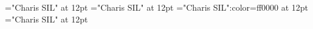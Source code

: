 \documentclass[a4paper]{article}
\begin{document}
\pagestyle{plain}
\sloppy
\setlength{\parfillskip}{0pt plus 1fil}
\font{}="Charis SIL" at 12pt
\font\cletHeaddicBody="Charis SIL" at 12pt
\font\aletHeaddicBody="Charis SIL":color=ff0000 at 12pt
\font\bletHeaddicBody="Charis SIL" at 12pt

\newpage 
\thispagestyle{empty} 
\mbox{} 
\newpage 
\newpage 
\setcounter{page}{1} 
\pagestyle{fancy} 

\end{document}

